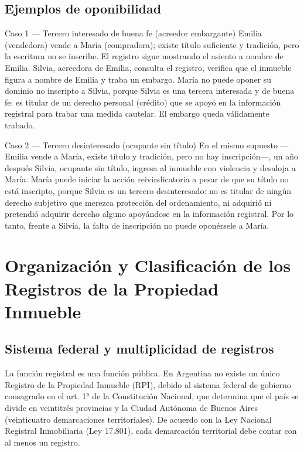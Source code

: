 \documentclass[12pt,oneside]{book}
\begin{document}
\section{Ejemplos de oponibilidad}

\begin{example}{Caso 1 — Tercero interesado de buena fe (acreedor embargante)}
Emilia (vendedora) vende a María (compradora); existe título suficiente y tradición, pero la escritura no se inscribe. El registro sigue mostrando el asiento a nombre de Emilia. Silvia, acreedora de Emilia, consulta el registro, verifica que el inmueble figura a nombre de Emilia y traba un embargo. María no puede oponer su dominio no inscripto a Silvia, porque Silvia es una tercera interesada y de buena fe: es titular de un derecho personal (crédito) que se apoyó en la información registral para trabar una medida cautelar. El embargo queda válidamente trabado.
\end{example}

\begin{example}{Caso 2 — Tercero desinteresado (ocupante sin título)}
En el mismo supuesto —Emilia vende a María, existe título y tradición, pero no hay inscripción—, un año después Silvia, ocupante sin título, ingresa al inmueble con violencia y desaloja a María. María puede iniciar la acción reivindicatoria a pesar de que su título no está inscripto, porque Silvia es un tercero desinteresado: no es titular de ningún derecho subjetivo que merezca protección del ordenamiento, ni adquirió ni pretendió adquirir derecho alguno apoyándose en la información registral. Por lo tanto, frente a Silvia, la falta de inscripción no puede oponérsele a María.
\end{example}


\chapter{Organización y Clasificación de los Registros de la Propiedad Inmueble}

\section{Sistema federal y multiplicidad de registros}

La función registral es una función pública. En Argentina no existe un único Registro de la Propiedad Inmueble (RPI), debido al sistema federal de gobierno consagrado en el art. 1° de la Constitución Nacional, que determina que el país se divide en veintitrés provincias y la Ciudad Autónoma de Buenos Aires (veinticuatro demarcaciones territoriales). De acuerdo con la Ley Nacional Registral Inmobiliaria (Ley 17.801), cada demarcación territorial debe contar con al menos un registro.
\end{document}
